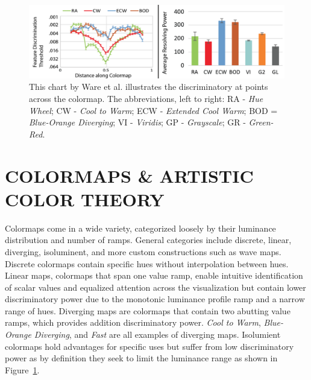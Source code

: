 \documentclass{IEEEcsmag}
\newcommand*{\colormap}[1]{\textsl{#1}\xspace}
\newcommand*{\huewheel}{\colormap{Hue Wheel}}
\newcommand*{\coolwarm}{\colormap{Cool to Warm}}
\newcommand*{\blueorange}{\colormap{Blue-Orange Diverging}}
\newcommand*{\fast}{\colormap{Fast}}
\newcommand*{\extendedcoolwarm}{\colormap{Extended Cool Warm}}
\begin{document}
\begin{figure}
\includegraphics[width=\linewidth]{pics/Ware17.png}
\caption{This chart by Ware et al. \cite{Ware2017} illustrates the discriminatory at points across the colormap. The abbreviations, left to right: RA - \huewheel; CW - \coolwarm; ECW - \extendedcoolwarm; BOD = \blueorange; VI - \colormap{Viridis}; GP - \colormap{Grayscale}; GR - \colormap{Green-Red}. }
\label{Ware}
\end{figure}


\section {COLORMAPS \& ARTISTIC COLOR THEORY}

Colormaps come in a wide variety, categorized loosely by their luminance distribution and number of ramps.
General categories include discrete, linear, diverging, isoluminent, and more custom constructions such as wave maps.
Discrete colormaps contain specific hues without interpolation between hues.
Linear maps, colormaps that span one value ramp, enable intuitive identification of scalar values and equalized attention across the visualization but contain lower discriminatory power due to the monotonic luminance profile ramp and a narrow range of hues.
Diverging maps are colormaps that contain two abutting value ramps, which provides addition discriminatory power.
\coolwarm, \blueorange, and \fast are all examples of diverging maps.
Isolumient colormaps hold advantages for specific uses but suffer from low discriminatory power as by definition they seek to limit the luminance range as shown in Figure~\ref{Ware}.
\end{document}
